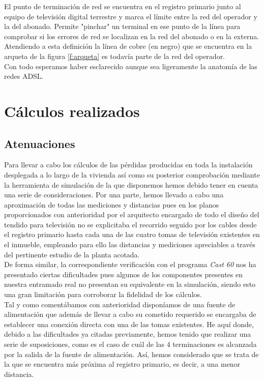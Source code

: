 \documentclass{article}[12 pt]
\begin{document}
			El punto de terminación de red se encuentra en el registro primario junto al equipo de televisión digital terrestre y marca el límite entre la red del operador y la del abonado. Permite "pinchar" un terminal en ese punto de la línea para comprobar si los errores de red se localizan en la red del abonado o en la externa. Atendiendo a esta definición la línea de cobre (en negro) que se encuentra en la arqueta de la figura \ref{f:arqueta} es todavía parte de la red del operador.\\

			Con todo esperamos haber esclarecido aunque sea ligeramente la anatomía de las redes ADSL.

	\newpage

	\section{Cálculos realizados}
		\subsection{Atenuaciones}
			Para llevar a cabo los cálculos de las pérdidas producidas en toda la instalación desplegada a lo largo de la vivienda así como su posterior comprobación mediante la herramienta de simulación de la que disponemos hemos debido tener en cuenta una serie de consideraciones. Por una parte, hemos llevado a cabo una aproximación de todas las mediciones y distancias pues en los planos proporcionados con anterioridad por el arquitecto encargado de todo el diseño del tendido para televisión no se explicitaba el recorrido seguido por los cables desde el registro primario hasta cada una de las cuatro tomas de televisión existentes en el inmueble, empleando para ello las distancias y mediciones apreciables a través del pertinente estudio de la planta acotada.\\

			De forma similar, la correspondiente verificación con el programa \textit{Cast 60} nos ha presentado ciertas dificultades pues algunos de los componentes presentes en nuestra entramado real no presentan su equivalente en la simulación, siendo esto una gran limitación para corroborar la fidelidad de los cálculos.\\

			Tal y como comentábamos con anterioridad disponíamos de una fuente de alimentación que además de llevar a cabo su cometido requerido se encargaba de establecer una conexión directa con una de las tomas existentes. He aquí donde, debido a las dificultades ya citadas previamente, hemos tenido que realizar una serie de suposiciones, como es el caso de cuál de las 4 terminaciones es alcanzada por la salida de la fuente de alimentación. Así, hemos considerado que se trata de la que se encuentra más próxima al registro primario, es decir, a una menor distancia.\\
\end{document}
